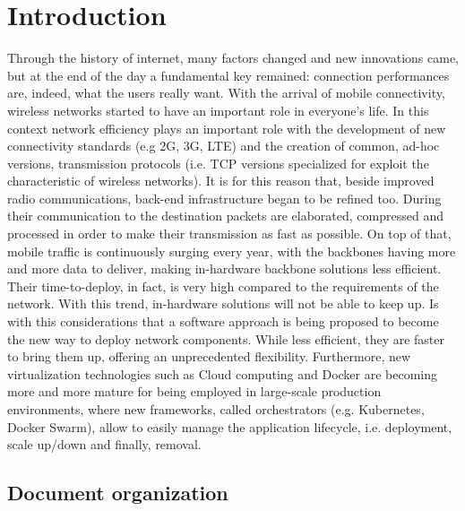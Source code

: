  
\chapter{Introduction}
\label{chap:intro}

 Through the history of internet, many factors changed and new innovations came,
 but at the end of the day a fundamental key remained: connection performances
 are, indeed, what the users really want.
With the arrival of mobile connectivity, wireless networks started to have an 
important role in everyone's life. In this context network efficiency plays 
an important role with the development of new connectivity standards (e.g 2G, 
3G, LTE) and the creation of common, ad-hoc versions, transmission protocols 
(i.e. TCP versions specialized for exploit the characteristic of 
wireless networks). It is for this reason that, beside improved radio 
communications, back-end infrastructure began to be refined too. During their 
communication to the destination packets are elaborated, compressed and 
processed in order to make their transmission as fast as possible.
On top of that, mobile traffic is continuously surging every year, with the 
backbones having more and more data to deliver, making in-hardware backbone 
solutions less efficient. Their time-to-deploy, in fact, is very high compared 
to the requirements of the network. With this trend, in-hardware solutions 
will not be able to keep up. Is with this considerations that a software 
approach is being proposed to become the new way to deploy network 
components. While less efficient, they are faster to bring them up, offering an 
unprecedented flexibility.
 Furthermore, new virtualization technologies such as Cloud computing and Docker
 are becoming more and more mature for being employed in large-scale production
 environments, where new frameworks, called orchestrators (e.g. Kubernetes,
 Docker Swarm), allow to easily manage the application lifecycle, i.e.
 deployment, scale up/down and finally, removal.
 
 \section{Document organization}
 
